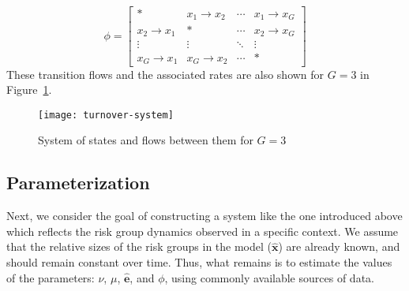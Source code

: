 \begin{equation}\label{eq:phi}
\phi = \left[\begin{array}{cccc}
	         *          & x_1  \rightarrow x_2 & \cdots & x_1 \rightarrow x_G \\[0.5em]
	x_2 \rightarrow x_1 &          *           & \cdots & x_2 \rightarrow x_G \\[0.5em]
	      \vdots        &        \vdots        & \ddots &       \vdots        \\[0.5em]
	x_G \rightarrow x_1 & x_G \rightarrow x_2  & \cdots &          *
\end{array}\right]
\end{equation}
These transition flows and the associated rates
are also shown for $G = 3$ in Figure~\ref{fig:system}.
\begin{figure}
  \centering
  \texttt{[image: turnover-system]}
  \caption{System of states and flows between them for $G = 3$}
  \label{fig:system}
\end{figure}
\subsection{Parameterization}\label{ss:params}
Next, we consider the goal of constructing a system like the one introduced above
which reflects the risk group dynamics observed in a specific context.
We assume that the relative sizes of the risk groups in the model ($\bm{\hat{x}}$)
are already known, and should remain constant over time.
Thus, what remains is to estimate the values of the parameters:
$\nu$, $\mu$, $\bm{\hat{e}}$, and $\phi$,
using commonly available sources of data.
